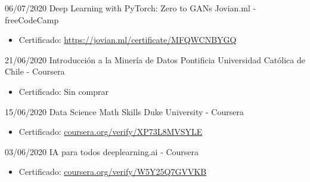 \begin{entrylist}
    \entry
		{06/07/2020}
		{Deep Learning with PyTorch: Zero to GANs}
		{Jovian.ml - freeCodeCamp}
		{
		    \vspace{-5mm}
		    \begin{itemize}
		        \setlength\itemsep{0pt}
		        \item Certificado: {\href{https://jovian.ml/certificate/MFQWCNBYGQ}{https://jovian.ml/certificate/MFQWCNBYGQ}}
		    \end{itemize}
		}
    \entry
		{21/06/2020}
		{Introducción a la Minería de Datos}
		{Pontificia Universidad Católica de Chile - Coursera}
		{
		    \vspace{-5mm}
		    \begin{itemize}
		        \setlength\itemsep{0pt}
		        \item Certificado: Sin comprar
		    \end{itemize}
		}
    \entry
		{15/06/2020}
		{Data Science Math Skills}
		{Duke University - Coursera}
		{
		    \vspace{-5mm}
		    \begin{itemize}
		        \setlength\itemsep{0pt}
		        \item Certificado: {\href{https://coursera.org/verify/XP73L8MVSYLE}{coursera.org/verify/XP73L8MVSYLE}}
		    \end{itemize}
		}
    \entry
		{03/06/2020}
		{IA para todos}
		{deeplearning.ai - Coursera}
		{
		    \vspace{-5mm}
		    \begin{itemize}
		        \setlength\itemsep{0pt}
		        \item Certificado: {\href{https://coursera.org/verify/W5Y25Q7GVVKB}{coursera.org/verify/W5Y25Q7GVVKB}}

\end{itemize}}
\end{entrylist}
